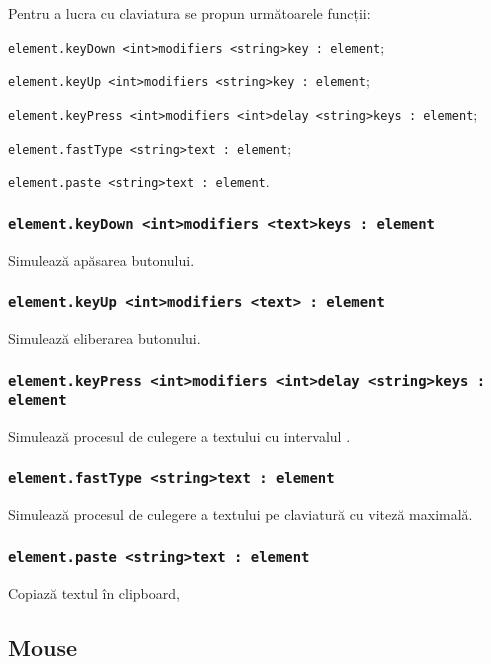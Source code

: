 Pentru a lucra cu claviatura se propun următoarele funcții:
\begin{icItems}
	\item \lstinline|element.keyDown <int>modifiers <string>key : element|;
	\item \lstinline|element.keyUp <int>modifiers <string>key : element|;
	\item \lstinline|element.keyPress <int>modifiers <int>delay <string>keys : element|;
	\item \lstinline|element.fastType <string>text : element|;
	\item \lstinline|element.paste <string>text : element|.
\end{icItems}

\subsubsection{\lstinline|element.keyDown <int>modifiers <text>keys : element|}

Simulează apăsarea butonului.

\subsubsection{\lstinline|element.keyUp <int>modifiers <text> : element|}

Simulează eliberarea butonului.

\subsubsection{\lstinline|element.keyPress <int>modifiers <int>delay <string>keys : element|}

Simulează procesul de culegere a textului cu intervalul .

\subsubsection{\lstinline|element.fastType <string>text : element|}

Simulează procesul de culegere a textului pe claviatură cu viteză maximală.

\subsubsection{\lstinline|element.paste <string>text : element|}

Copiază textul în clipboard, 

\subsection{Mouse}
\label{mouse}

